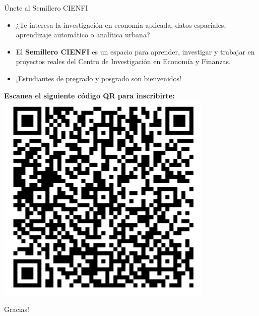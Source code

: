 \documentclass{beamer}
\begin{document}
\begin{frame}{Únete al Semillero CIENFI}
\vspace{0.5em}
\begin{itemize}
    \item ¿Te interesa la investigación en economía aplicada, datos espaciales, aprendizaje automático o analítica urbana?
    \item El \textbf{Semillero CIENFI} es un espacio para aprender, investigar y trabajar en proyectos reales del Centro de Investigación en Economía y Finanzas.
    \item ¡Estudiantes de pregrado y posgrado son bienvenidos!
\end{itemize}
\centering
\textbf{Escanea el siguiente código QR para inscribirte:} \\
\includegraphics[width=0.4\linewidth]{figures/qr.png}
\end{frame}

\begin{frame}
    \begin{center}
    \Huge Gracias!
    \end{center}
\end{frame}
\end{document}
